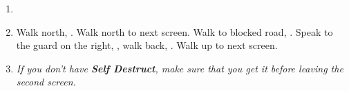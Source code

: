 \begin{enumerate}[resume]
	\item \sd
	\item Walk north, \save. Walk north to next screen. Walk to blocked road, \sd. Speak to the guard on the right, \sd, walk back, \sd. Walk up to next screen.
	\item \textit{If you don't have \textbf{Self Destruct}, make sure that you get it before leaving the second screen.}
\end{enumerate}
